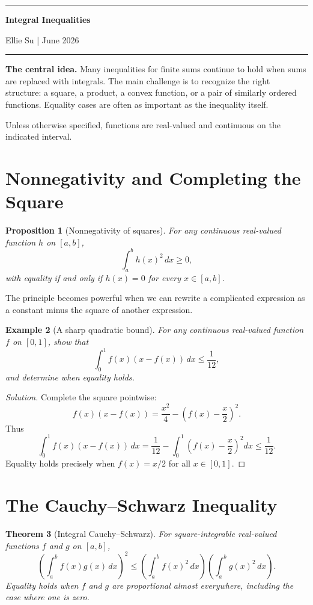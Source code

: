 \documentclass[11pt]{article}
\author{Ellie Su}
\theoremstyle{plaincolon}
\newtheorem{theorem}{Theorem}[section]
\newtheorem{proposition}[theorem]{Proposition}
\theoremstyle{definitioncolon}
\newtheorem{example}[theorem]{Example}
\theoremstyle{remarkcolon}
\newenvironment{solution}{\begin{proof}[Solution]}{\end{proof}}
\newcommand{\settitle}[2]{%
    \thispagestyle{fancy}
    \begingroup
    \centering
    \vspace*{-0.65cm}
    {\color{deepblue}\rule{0.72\textwidth}{1.1pt}\par}
    \vspace{0.35cm}
    {\fontsize{30}{34}\selectfont\bfseries\color{deepblue}#1\par}
    \vspace{0.2cm}
    {\small\color{grayborder}#2\par}
    \vspace{0.35cm}
    {\color{deepblue}\rule{0.72\textwidth}{0.7pt}\par}
    \vspace{0.5cm}
    \endgroup
}
\numberwithin{equation}{section}
\begin{document}
\settitle{Integral Inequalities}{Ellie Su \quad | \quad June 2026}

\begin{mathbox}
\textbf{The central idea.} Many inequalities for finite sums continue to hold when sums are replaced with integrals. The main challenge is to recognize the right structure: a square, a product, a convex function, or a pair of similarly ordered functions. Equality cases are often as important as the inequality itself.

Unless otherwise specified, functions are real-valued and continuous on the indicated interval.
\end{mathbox}

\section{Nonnegativity and Completing the Square}

\begin{proposition}[Nonnegativity of squares]
For any continuous real-valued function $h$ on $[a,b]$,
\[
\int_a^b h(x)^2\,dx\ge 0,
\]
with equality if and only if $h(x)=0$ for every $x\in[a,b]$.
\end{proposition}

The principle becomes powerful when we can rewrite a complicated expression as a constant minus the square of another expression.

\begin{example}[A sharp quadratic bound]
For any continuous real-valued function $f$ on $[0,1]$, show that
\[
\int_0^1 f(x)(x-f(x))\,dx\le\frac1{12},
\]
and determine when equality holds.
\end{example}

\begin{solution}
Complete the square pointwise:
\[
f(x)(x-f(x))=\frac{x^2}{4}-\left(f(x)-\frac{x}{2}\right)^2.
\]
Thus
\[
\int_0^1 f(x)(x-f(x))\,dx
=\frac1{12}-\int_0^1\left(f(x)-\frac{x}{2}\right)^2dx
\le\frac1{12}.
\]
Equality holds precisely when $f(x)=x/2$ for all $x\in[0,1]$.
\end{solution}

\section{The Cauchy--Schwarz Inequality}

\begin{theorem}[Integral Cauchy--Schwarz]
For square-integrable real-valued functions $f$ and $g$ on $[a,b]$,
\[
\left(\int_a^b f(x)g(x)\,dx\right)^2\le
\left(\int_a^b f(x)^2\,dx\right)
\left(\int_a^b g(x)^2\,dx\right).
\]
Equality holds when $f$ and $g$ are proportional almost everywhere, including the case where one is zero.
\end{theorem}
\end{document}
